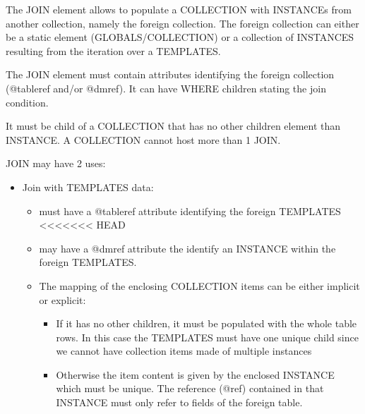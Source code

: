 The JOIN element allows to populate a COLLECTION with INSTANCEs from another collection, namely the foreign collection.
The foreign collection can either be a static element (GLOBALS/COLLECTION) or a collection of INSTANCES resulting from the iteration over a TEMPLATES.

The JOIN element must contain attributes identifying the foreign collection  (@tableref and/or @dmref). 
It can have WHERE children stating the join condition.

It must be child of a COLLECTION that has no other children element than INSTANCE. A COLLECTION cannot host more than 1 JOIN.

JOIN may have 2 uses:

\begin{itemize}

  \item Join with TEMPLATES data:
       \begin{itemize}
         \item must have a @tableref attribute identifying the foreign TEMPLATES
<<<<<<< HEAD
         \item may have a @dmref attribute the identify an INSTANCE within the foreign TEMPLATES.
         \item The mapping of the enclosing COLLECTION items can be either implicit or explicit:
         \begin{itemize}
             \item If it has no other children, it must be populated with the whole table rows. In this case the TEMPLATES must have one unique child 
                      since we cannot have collection items made of multiple instances
             \item Otherwise the item content is given by the enclosed INSTANCE which must be unique.
                     The reference (@ref) contained in that INSTANCE must only refer to fields of the foreign table.
         \end{itemize}
  \end{itemize}


\end{itemize}
